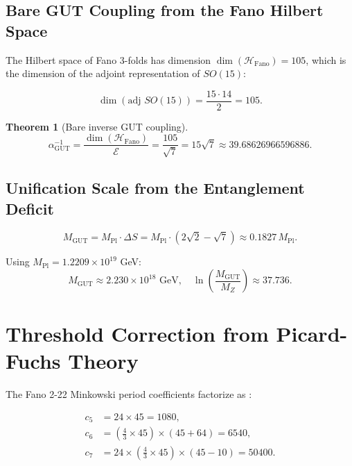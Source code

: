 \documentclass[12pt]{article}
\newtheorem{theorem}{Theorem}[section]
\begin{document}
\subsection{Bare GUT Coupling from the Fano Hilbert Space}

The Hilbert space of Fano 3-folds has dimension \(\dim(\mathcal{H}_{\text{Fano}}) = 105\), which is the dimension of the adjoint representation of \(SO(15)\):

\begin{equation}
\dim(\text{adj } SO(15)) = \frac{15 \cdot 14}{2} = 105 .
\label{eq:so15_dim}
\end{equation}

\begin{theorem}[Bare inverse GUT coupling]
\begin{equation}
\boxed{\alpha_{\text{GUT}}^{-1} = \frac{\dim(\mathcal{H}_{\text{Fano}})}{\mathcal{E}} = \frac{105}{\sqrt{7}} = 15\sqrt{7} \approx 39.68626966596886 .}
\label{eq:alpha_gut}
\end{equation}
\end{theorem}

\subsection{Unification Scale from the Entanglement Deficit}

\begin{equation}
\boxed{M_{\text{GUT}} = M_{\text{Pl}} \cdot \Delta S = M_{\text{Pl}} \cdot (2\sqrt{2} - \sqrt{7}) \approx 0.1827 \, M_{\text{Pl}} .}
\label{eq:mgut}
\end{equation}

Using \(M_{\text{Pl}} = 1.2209 \times 10^{19}\) GeV:
\[
M_{\text{GUT}} \approx 2.230 \times 10^{18} \text{ GeV}, \quad \ln\left(\frac{M_{\text{GUT}}}{M_Z}\right) \approx 37.736.
\]

\section{Threshold Correction from Picard-Fuchs Theory}

The Fano 2-22 Minkowski period coefficients factorize as \cite{coates2013}:

\begin{align}
c_5 &= 24 \times 45 = 1080, \\
c_6 &= \left(\frac{4}{3}\times 45\right) \times (45 + 64) = 6540, \\
c_7 &= 24 \times \left(\frac{4}{3}\times 45\right) \times (45 - 10) = 50400.
\end{align}
\end{document}
